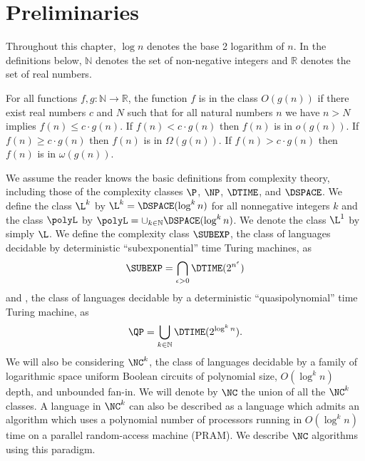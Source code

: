 
\section{Preliminaries}

Throughout this chapter, $\log n$ denotes the base 2 logarithm of $n$.
In the definitions below, $\mathbb{N}$ denotes the set of non-negative integers and $\mathbb{R}$ denotes the set of real numbers.

\begin{definition}
  For all functions $f, g \colon \mathbb{N} \to \mathbb{R}$, the function $f$ is in the class $O(g(n))$ if there exist real numbers $c$ and $N$ such that for all natural numbers $n$ we have $n > N$ implies $f(n) \leq c \cdot g(n)$.
  If $f(n) < c \cdot g(n)$ then $f(n)$ is in $o(g(n))$.
  If $f(n) \geq c \cdot g(n)$ then $f(n)$ is in $\Omega(g(n))$.
  If $f(n) > c \cdot g(n)$ then $f(n)$ is in $\omega(g(n))$.
\end{definition}

We assume the reader knows the basic definitions from complexity theory, including those of the complexity classes $\P$, $\NP$, $\DTIME$, and $\DSPACE$.
We define the class $\L^k$ by $\L^k = \DSPACE(\log^k n)$ for all nonnegative integers $k$ and the class $\polyL$ by $\polyL = \cup_{k \in \mathbb{N}} \DSPACE(\log^k n)$.
We denote the class $\L^1$ by simply $\L$.
We define the complexity class $\SUBEXP$, the class of languages decidable by deterministic ``subexponential'' time Turing machines, as
\begin{equation*}
  \SUBEXP = \bigcap_{\epsilon > 0} \DTIME(2^{n^\epsilon})
\end{equation*}
and \QP{}, the class of languages decidable by a deterministic ``quasipolynomial'' time Turing machine, as
\begin{equation*}
  \QP = \bigcup_{k \in \mathbb{N}} \DTIME(2^{\log^k n}).
\end{equation*}
We will also be considering $\NC^k$, the class of languages decidable by a family of logarithmic space uniform Boolean circuits of polynomial size, $O(\log^k n)$ depth, and unbounded fan-in.
We will denote by $\NC$ the union of all the $\NC^k$ classes.
A language in $\NC^k$ can also be described as a language which admits an algorithm which uses a polynomial number of processors running in $O(\log^k n)$ time on a parallel random-access machine (PRAM).
We describe $\NC$ algorithms using this paradigm.

